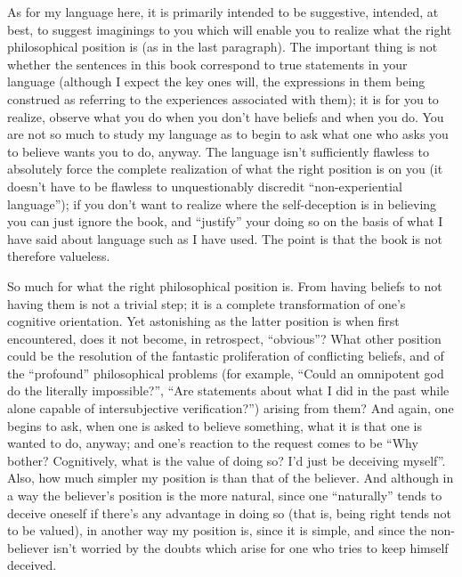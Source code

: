 As for my language here, it is primarily intended to be suggestive, 
intended, at best, to suggest imaginings to you which will enable you to 
realize what the right philosophical position is (as in the last paragraph). The 
important thing is not whether the sentences in this book correspond to true 
statements in your language (although I expect the key ones will, the 
expressions in them being construed as referring to the experiences 
associated with them); it is for you to realize, observe what you do when 
you don't have beliefs and when you do. You are not so much to study my 
language as to begin to ask what one who asks you to believe wants you to 
do, anyway. The language isn't sufficiently flawless to absolutely force the 
complete realization of what the right position is on you (it doesn't have to 
be flawless to unquestionably discredit \enquote{non-experiential language}); if you 
don't want to realize where the self-deception is in believing you can just 
ignore the book, and \enquote{justify} your doing so on the basis of what I have said 
about language such as I have used. The point is that the book is not 
therefore valueless. 

So much for what the right philosophical position is. From having 
beliefs to not having them is not a trivial step; it is a complete 
transformation of one's cognitive orientation. Yet astonishing as the latter 
position is when first encountered, does it not become, in retrospect, 
\enquote{obvious}? What other position could be the resolution of the fantastic 
proliferation of conflicting beliefs, and of the \enquote{profound} philosophical 
problems (for example, \enquote{Could an omnipotent god do the literally 
impossible?}, \enquote{Are statements about what I did in the past while alone 
capable of intersubjective verification?}) arising from them? And again, one 
begins to ask, when one is asked to believe something, what it is that one is 
wanted to do, anyway; and one's reaction to the request comes to be \enquote{Why 
bother? Cognitively, what is the value of doing so? I'd just be deceiving 
myself}. Also, how much simpler my position is than that of the believer. 
And although in a way the believer's position is the more natural, since one 
\enquote{naturally} tends to deceive oneself if there's any advantage in doing so 
(that is, being right tends not to be valued), in another way my position is, 
since it is simple, and since the non-believer isn't worried by the doubts 
which arise for one who tries to keep himself deceived. 


